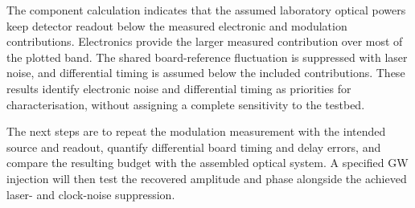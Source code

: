 \documentclass[aps,twocolumn,10pt,nofootinbib,floatfix]{revtex4-2}
\begin{document}
The component calculation indicates that the assumed laboratory optical powers keep detector readout below the measured electronic and modulation contributions. Electronics provide the larger measured contribution over most of the plotted band. The shared board-reference fluctuation is suppressed with laser noise, and differential timing is assumed below the included contributions. These results identify electronic noise and differential timing as priorities for characterisation, without assigning a complete sensitivity to the testbed.

The next steps are to repeat the modulation measurement with the intended source and readout, quantify differential board timing and delay errors, and compare the resulting budget with the assembled optical system. A specified GW injection will then test the recovered amplitude and phase alongside the achieved laser- and clock-noise suppression.




\newpage
\appendix




\end{document}
